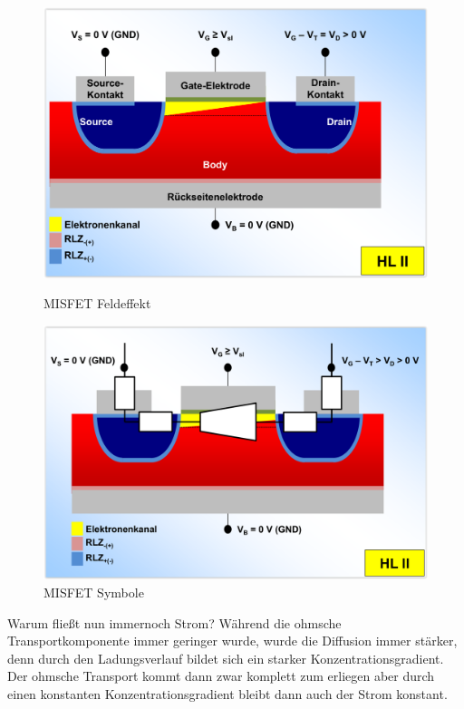 \documentclass[12pt,a4paper]{report}%
\numberwithin{equation}{section}
\numberwithin{equation}{subsection}
\begin{document}
	  \begin{figure}[H] 
			\centering
			\begin{minipage}{.5\textwidth}
			  \centering
			  \captionsetup{justification=centering}
	      \includegraphics[width=0.88\linewidth]{misfet_inversion_half.png}
	      \caption{MISFET Feldeffekt \protect\cite{MIKRO2}}
	      \label{fig:misfet_inversion_half}
			\end{minipage}%
			\begin{minipage}{.5\textwidth}
			  \centering
			  \captionsetup{justification=centering}
			  \includegraphics[width=0.92\linewidth]{misfet_inversion_symbols.png}
			  \caption{MISFET Symbole \protect\cite{MIKRO2}}
			  \label{fig:misfet_inversion_symbol}
			\end{minipage}%
	  \end{figure}
	  Warum fließt nun immernoch Strom? Während die ohmsche Transportkomponente immer geringer wurde, wurde die Diffusion immer stärker, denn durch den Ladungsverlauf bildet sich ein starker Konzentrationsgradient. Der ohmsche Transport kommt dann zwar komplett zum erliegen aber durch einen konstanten Konzentrationsgradient bleibt dann auch der Strom konstant. 
\newpage
\end{document}
